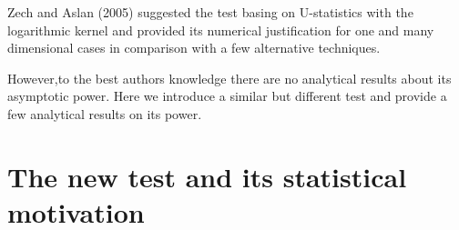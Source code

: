 \documentclass[slidestop,usepdftitle=false]{beamer}
\begin{document}
\begin{slide}
\bigskip


Zech and Aslan (2005) suggested the test basing on U-statistics with the logarithmic kernel and provided its numerical justification for one and many dimensional cases in comparison with a few alternative techniques.
\bigskip

However,to the best authors knowledge there are no analytical results about its asymptotic power. Here we introduce a similar but different test and provide a few analytical results on its power.
\end{slide}

\section{The new test and its statistical motivation}
\end{document}
